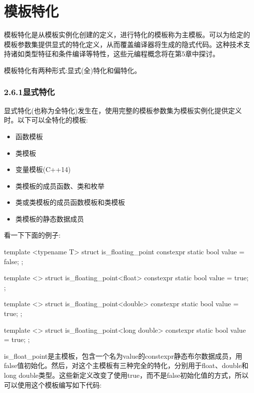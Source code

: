 \section{模板特化}

模板特化是从模板实例化创建的定义，进行特化的模板称为主模板。可以为给定的模板参数集提供显式的特化定义，从而覆盖编译器将生成的隐式代码。这种技术支持诸如类型特征和条件编译等特性，这些元编程概念将在第5章中探讨。

模板特化有两种形式:显式(全)特化和偏特化。

\subsubsection{2.6.1\hspace{0.2cm}显式特化}

显式特化(也称为全特化)发生在，使用完整的模板参数集为模板实例化提供定义时。以下可以全特化的模板:

\begin{itemize}
\item 
函数模板

\item 
类模板

\item 
变量模板(C++14)

\item 
类模板的成员函数、类和枚举

\item 
类或类模板的成员函数模板和类模板

\item 
类模板的静态数据成员
\end{itemize}

看一下下面的例子:

\begin{cpp}
template <typename T>
struct is_floating_point
{
	constexpr static bool value = false;
};

template <>
struct is_floating_point<float>
{
	constexpr static bool value = true;
};

template <>
struct is_floating_point<double>
{
	constexpr static bool value = true;
};

template <>
struct is_floating_point<long double>
{
	constexpr static bool value = true;
};
\end{cpp}

is\_float\_point是主模板，包含一个名为value的constexpr静态布尔数据成员，用false值初始化。然后，对这个主模板有三种完全的特化，分别用于float、double和long double类型。这些新定义改变了使用true，而不是false初始化值的方式，所以可以使用这个模板编写如下代码:

